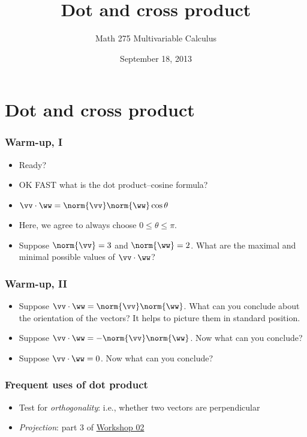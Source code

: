 \documentclass[11pt,ignorenonframetext,xcolor={svgnames},aspectratio=169]{beamer}
\title{Dot and cross product}
\author{Math 275 Multivariable Calculus}
\date{September 18, 2013 }
\begin{document}
\frame{\titlepage}

\section{Dot and cross product}

\begin{frame}\frametitle{Warm-up, I}

\begin{itemize}
\item
  Ready?
  \pause
\item
  OK FAST what is the dot product--cosine formula?
  \pause
\item
  $\vv \cdot \ww = \norm{\vv} \norm{\ww} \cos{\theta}$
  \pause
\item
  Here, we agree to always choose $0 \leq \theta \leq \pi$.
  \pause
\item
  Suppose $\norm{\vv} = 3$ and $\norm{\ww} = 2$. What are the maximal
  and minimal possible values of $\vv \cdot \ww$?
\end{itemize}

\end{frame}

\begin{frame}\frametitle{Warm-up, II}

\begin{itemize}
\item
  Suppose $\vv \cdot \ww = \norm{\vv} \norm{\ww}$. What can you conclude
  about the orientation of the vectors? It helps to picture them in
  standard position.
  \pause
\item
  Suppose $\vv \cdot \ww = -\norm{\vv} \norm{\ww}$. Now what can you
  conclude?
  \pause
\item
  Suppose $\vv \cdot \ww = 0$. Now what can you conclude?
\end{itemize}

\end{frame}

\begin{frame}\frametitle{Frequent uses of dot product}

\begin{itemize}

\item
  Test for \emph{orthogonality}: i.e., whether two vectors are
  perpendicular
\item
  \emph{Projection}: part 3 of
  \href{../../workshops/02/Workshop.pdf}{Workshop 02}
\end{itemize}

\end{frame}
\end{document}
